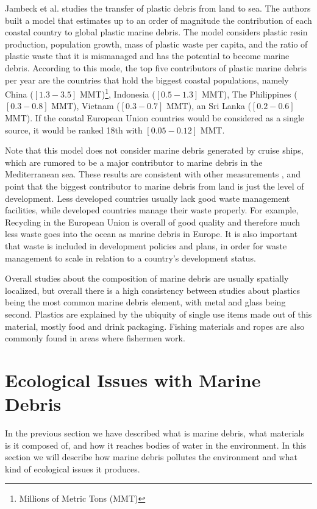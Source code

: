 Jambeck et al.\cite{jambeck2015plastic} studies the transfer of plastic debris from land to sea. The authors built a model that estimates up to an order of magnitude the contribution of each coastal country to global plastic marine debris. The model considers plastic resin production, population growth, mass of plastic waste per capita, and the ratio of plastic waste that it is mismanaged and has the potential to become marine debris. According to this mode, the top five contributors of plastic marine debris per year are the countries that hold the biggest coastal populations, namely China ($[1.3 - 3.5]$ MMT)\footnote{Millions of Metric Tons (MMT)}, Indonesia ($[0.5 - 1.3]$ MMT), The Philippines ($[0.3 - 0.8]$ MMT), Vietnam ($[0.3 - 0.7]$ MMT), an Sri Lanka ($[0.2 - 0.6]$ MMT). If the coastal European Union countries would be considered as a single source, it would be ranked 18th with $[0.05 - 0.12]$ MMT.

Note that this model does not consider marine debris generated by cruise ships, which are rumored to be a major contributor to marine debris in the Mediterranean sea. These results are consistent with other measurements \cite{eriksen2014plastic}, and point that the biggest contributor to marine debris from land is just the level of development. Less developed countries usually lack good waste management facilities, while developed countries manage their waste properly. For example, Recycling in the European Union is overall of good quality and therefore much less waste goes into the ocean as marine debris in Europe. It is also important that waste is included in development policies and plans, in order for waste management to scale in relation to a country's development status.

Overall studies about the composition of marine debris are usually spatially localized, but overall there is a high consistency between studies about plastics being the most common marine debris element, with metal and glass being second. Plastics are explained by the ubiquity of single use items made out of this material, mostly food and drink packaging. Fishing materials and ropes are also commonly found in areas where fishermen work.

\section{Ecological Issues with Marine Debris}

In the previous section we have described what is marine debris, what materials is it composed of, and how it reaches bodies of water in the environment. In this section we will describe how marine debris pollutes the environment and what kind of ecological issues it produces.

